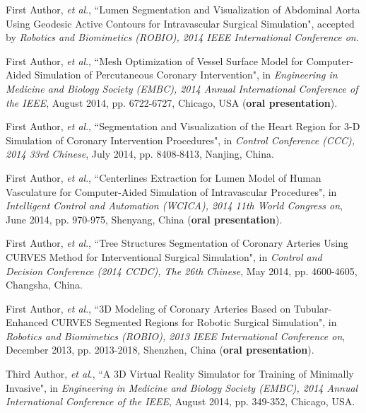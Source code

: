 
\begin{publications}{99}

\item First Author, \textit{et al}., ``Lumen Segmentation and Visualization of Abdominal Aorta Using Geodesic Active Contours for Intravascular Surgical Simulation", accepted by \textit{Robotics and Biomimetics (ROBIO), 2014 IEEE International Conference on}.%

\item First Author, \textit{et al}., ``Mesh Optimization of Vessel Surface Model for Computer-Aided Simulation of Percutaneous Coronary Intervention", in \textit{Engineering in Medicine and Biology Society (EMBC), 2014 Annual International Conference of the IEEE}, August 2014, pp. 6722-6727, Chicago, USA (\textbf{oral presentation}).%

\item First Author, \textit{et al}., ``Segmentation and Visualization of the Heart Region for 3-D Simulation of Coronary Intervention Procedures", in \textit{Control Conference (CCC), 2014 33rd Chinese}, July 2014, pp. 8408-8413, Nanjing, China.%

\item First Author, \textit{et al}., ``Centerlines Extraction for Lumen Model of Human Vasculature for Computer-Aided Simulation of Intravascular Procedures", in \textit{Intelligent Control and Automation (WCICA), 2014 11th World Congress on}, June 2014, pp. 970-975, Shenyang, China (\textbf{oral presentation}).%

\item First Author, \textit{et al}., ``Tree Structures Segmentation of Coronary Arteries Using CURVES Method for Interventional Surgical Simulation", in \textit{Control and Decision Conference (2014 CCDC), The 26th Chinese}, May 2014, pp. 4600-4605, Changsha, China.%

\item First Author, \textit{et al}., ``3D Modeling of Coronary Arteries Based on Tubular-Enhanced CURVES Segmented Regions for Robotic Surgical Simulation", in \textit{Robotics and Biomimetics (ROBIO), 2013 IEEE International Conference on}, December 2013, pp. 2013-2018, Shenzhen, China (\textbf{oral presentation}).%

\item Third Author, \textit{et al}., ``A 3D Virtual Reality Simulator for Training of Minimally Invasive", in \textit{Engineering in Medicine and Biology Society (EMBC), 2014 Annual International Conference of the IEEE}, August 2014, pp. 349-352, Chicago, USA.%


\end{publications}
